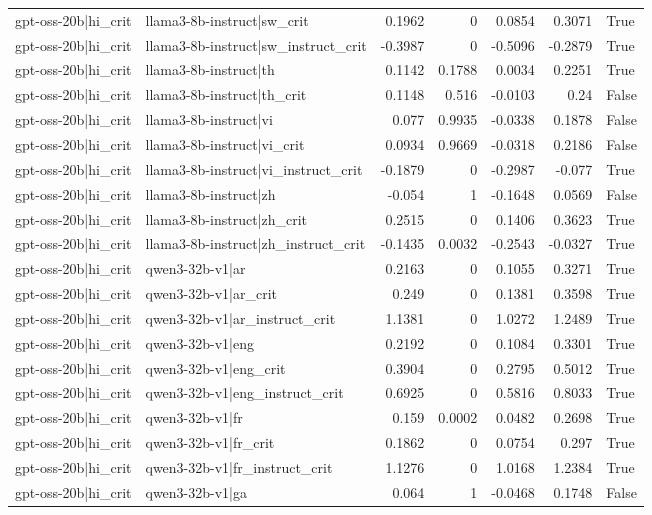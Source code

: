 \begin{table}
\begin{tabular}{l l r r r r l}
gpt-oss-20b|hi_crit & llama3-8b-instruct|sw_crit & 0.1962 & 0 & 0.0854 & 0.3071 & True \\
gpt-oss-20b|hi_crit & llama3-8b-instruct|sw_instruct_crit & -0.3987 & 0 & -0.5096 & -0.2879 & True \\
gpt-oss-20b|hi_crit & llama3-8b-instruct|th & 0.1142 & 0.1788 & 0.0034 & 0.2251 & True \\
gpt-oss-20b|hi_crit & llama3-8b-instruct|th_crit & 0.1148 & 0.516 & -0.0103 & 0.24 & False \\
gpt-oss-20b|hi_crit & llama3-8b-instruct|vi & 0.077 & 0.9935 & -0.0338 & 0.1878 & False \\
gpt-oss-20b|hi_crit & llama3-8b-instruct|vi_crit & 0.0934 & 0.9669 & -0.0318 & 0.2186 & False \\
gpt-oss-20b|hi_crit & llama3-8b-instruct|vi_instruct_crit & -0.1879 & 0 & -0.2987 & -0.077 & True \\
gpt-oss-20b|hi_crit & llama3-8b-instruct|zh & -0.054 & 1 & -0.1648 & 0.0569 & False \\
gpt-oss-20b|hi_crit & llama3-8b-instruct|zh_crit & 0.2515 & 0 & 0.1406 & 0.3623 & True \\
gpt-oss-20b|hi_crit & llama3-8b-instruct|zh_instruct_crit & -0.1435 & 0.0032 & -0.2543 & -0.0327 & True \\
gpt-oss-20b|hi_crit & qwen3-32b-v1|ar & 0.2163 & 0 & 0.1055 & 0.3271 & True \\
gpt-oss-20b|hi_crit & qwen3-32b-v1|ar_crit & 0.249 & 0 & 0.1381 & 0.3598 & True \\
gpt-oss-20b|hi_crit & qwen3-32b-v1|ar_instruct_crit & 1.1381 & 0 & 1.0272 & 1.2489 & True \\
gpt-oss-20b|hi_crit & qwen3-32b-v1|eng & 0.2192 & 0 & 0.1084 & 0.3301 & True \\
gpt-oss-20b|hi_crit & qwen3-32b-v1|eng_crit & 0.3904 & 0 & 0.2795 & 0.5012 & True \\
gpt-oss-20b|hi_crit & qwen3-32b-v1|eng_instruct_crit & 0.6925 & 0 & 0.5816 & 0.8033 & True \\
gpt-oss-20b|hi_crit & qwen3-32b-v1|fr & 0.159 & 0.0002 & 0.0482 & 0.2698 & True \\
gpt-oss-20b|hi_crit & qwen3-32b-v1|fr_crit & 0.1862 & 0 & 0.0754 & 0.297 & True \\
gpt-oss-20b|hi_crit & qwen3-32b-v1|fr_instruct_crit & 1.1276 & 0 & 1.0168 & 1.2384 & True \\
gpt-oss-20b|hi_crit & qwen3-32b-v1|ga & 0.064 & 1 & -0.0468 & 0.1748 & False \\

\end{tabular}
\end{table}

